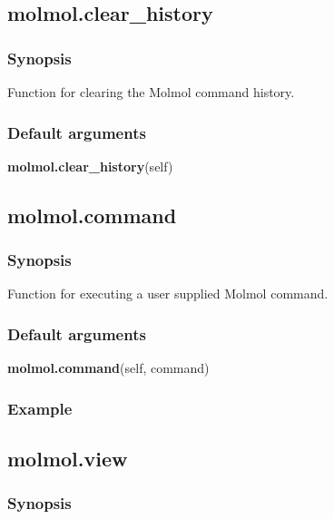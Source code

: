 \subsection{molmol.clear\_history}


\subsubsection{Synopsis}

Function for clearing the Molmol command history.

\subsubsection{Default arguments}

\textsf{\textbf{molmol.clear\_history}(self)}



\newpage

\subsection{molmol.command}


\subsubsection{Synopsis}

Function for executing a user supplied Molmol command.

\subsubsection{Default arguments}

\textsf{\textbf{molmol.command}(self, command)}


\subsubsection{Example}




\newpage

\subsection{molmol.view}


\subsubsection{Synopsis}

